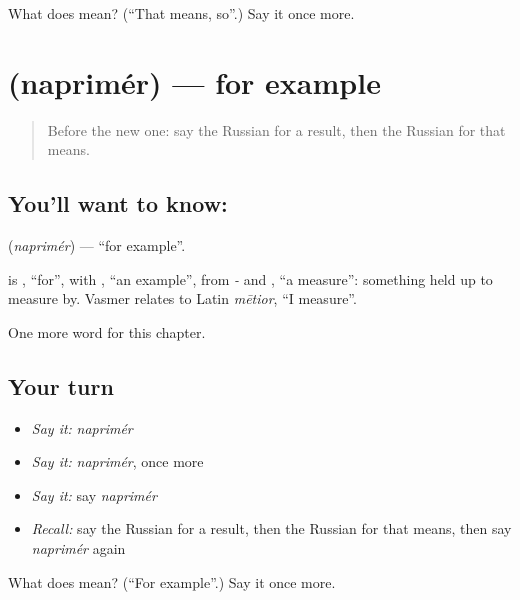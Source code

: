 \begin{tcolorbox}[breakable,colback=teal!4,colframe=teal!35!black,title={Before you move on}]
What does  mean? (\textquotedblleft{}That means, so\textquotedblright{}.) Say it once more.
\end{tcolorbox}
\section[\texorpdfstring{\ru{например} (naprimér)}{например (naprimér)}]{ (naprimér) — for example}

\label{lesson:RU-C185-naprimer}



\begin{quote}
Before the new one: say the Russian for a result, then the Russian for that means.
\end{quote}

\subsection*{You'll want to know: }
\textbf{} (\emph{naprimér}) — \textquotedblleft{}for example\textquotedblright{}.

\begin{cousinweb}
\textbf{} is \emph{}, \textquotedblleft{}for\textquotedblright{}, with \emph{}, \textquotedblleft{}an example\textquotedblright{}, from \emph{-} and \emph{}, \textquotedblleft{}a measure\textquotedblright{}: something held up to measure by. Vasmer relates \emph{} to Latin \emph{mētior}, \textquotedblleft{}I measure\textquotedblright{}.
\end{cousinweb}

\begin{grammarlens}[title={What you've built}]
One more word for this chapter.
\end{grammarlens}

\subsection*{Your turn}
\begin{itemize}
\raggedright
  \item \emph{Say it:} \emph{naprimér}
  \item \emph{Say it:} \emph{naprimér}, once more
  \item \emph{Say it:} say \emph{naprimér}
  \item \emph{Recall:} say the Russian for a result, then the Russian for that means, then say \emph{naprimér} again
\end{itemize}

\begin{tcolorbox}[breakable,colback=teal!4,colframe=teal!35!black,title={Before you move on}]
What does  mean? (\textquotedblleft{}For example\textquotedblright{}.) Say it once more.
\end{tcolorbox}
